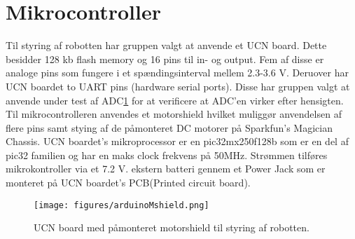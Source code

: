 \section{Mikrocontroller}
\label{ref_adc}
Til  styring af robotten har gruppen valgt at anvende et UCN board. Dette besidder 128 kb flash memory og 16 pins til in- og output. Fem af disse er analoge pins som fungere i et spændingsinterval mellem 2.3-3.6 V. 
\newline
Deruover har UCN boardet to UART pins (hardware serial ports). Disse har gruppen valgt at anvende under test af ADC\ref{ref_adc} for at verificere at ADC'en virker efter hensigten. 
Til mikrocontrolleren anvendes et motorshield hvilket muliggør anvendelsen af flere pins samt stying af de påmonteret DC motorer på Sparkfun's Magician Chassis.
\newline 
UCN boardet's mikroprocessor er en pic32mx250f128b som er en del af pic32 familien og har en maks clock frekvens på 50MHz. 
Strømmen tilføres mikrokontroller via et 7.2 V. ekstern batteri gennem et Power Jack som er monteret på UCN boardet's PCB(Printed circuit board). 

\begin{figure}[h!]
  \centering
  \texttt{[image: figures/arduinoMshield.png]}
  \caption{UCN board med påmonteret motorshield til styring af robotten.}
  \label{arduino&shield}
\end{figure}
